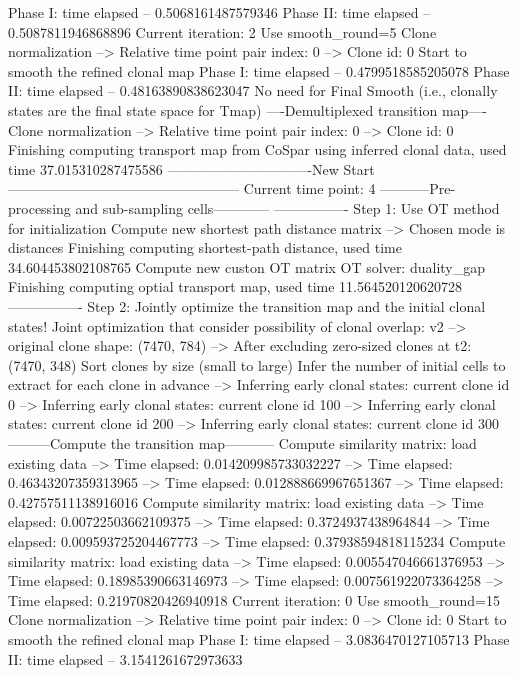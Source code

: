 \documentclass[letterpaper,10pt,english]{sphinxmanual}
\begin{document}
{\begin{sphinxVerbatim}[commandchars=\\\{\}]
Phase I: time elapsed --  0.5068161487579346
Phase II: time elapsed --  0.5087811946868896
Current iteration: 2
Use smooth\_round=5
Clone normalization
--> Relative time point pair index: 0
--> Clone id: 0
Start to smooth the refined clonal map
Phase I: time elapsed --  0.4799518585205078
Phase II: time elapsed --  0.48163890838623047
No need for Final Smooth (i.e., clonally states are the final state space for Tmap)
----Demultiplexed transition map----
Clone normalization
--> Relative time point pair index: 0
--> Clone id: 0
Finishing computing transport map from CoSpar using inferred clonal data, used time 37.015310287475586
-------------------------------New Start--------------------------------------------------
Current time point: 4
-----------Pre-processing and sub-sampling cells------------
----------------
Step 1: Use OT method for initialization
Compute new shortest path distance matrix
--> Chosen mode is distances
Finishing computing shortest-path distance, used time 34.604453802108765
Compute new custon OT matrix
OT solver: duality\_gap
Finishing computing optial transport map, used time 11.564520120620728
----------------
Step 2: Jointly optimize the transition map and the initial clonal states!
Joint optimization that consider possibility of clonal overlap: v2
--> original clone shape: (7470, 784)
--> After excluding zero-sized clones at t2: (7470, 348)
Sort clones by size (small to large)
Infer the number of initial cells to extract for each clone in advance
--> Inferring early clonal states: current clone id 0
--> Inferring early clonal states: current clone id 100
--> Inferring early clonal states: current clone id 200
--> Inferring early clonal states: current clone id 300
---------Compute the transition map-----------
Compute similarity matrix: load existing data
--> Time elapsed:  0.014209985733032227
--> Time elapsed:  0.46343207359313965
--> Time elapsed:  0.012888669967651367
--> Time elapsed:  0.42757511138916016
Compute similarity matrix: load existing data
--> Time elapsed:  0.00722503662109375
--> Time elapsed:  0.3724937438964844
--> Time elapsed:  0.009593725204467773
--> Time elapsed:  0.37938594818115234
Compute similarity matrix: load existing data
--> Time elapsed:  0.005547046661376953
--> Time elapsed:  0.18985390663146973
--> Time elapsed:  0.007561922073364258
--> Time elapsed:  0.21970820426940918
Current iteration: 0
Use smooth\_round=15
Clone normalization
--> Relative time point pair index: 0
--> Clone id: 0
Start to smooth the refined clonal map
Phase I: time elapsed --  3.0836470127105713
Phase II: time elapsed --  3.1541261672973633

\end{sphinxVerbatim}}
\end{document}
